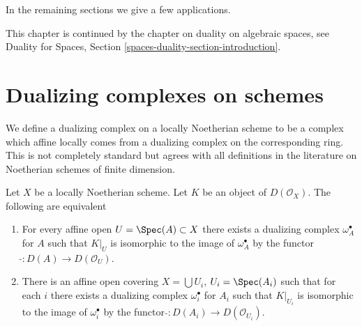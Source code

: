 \medskip\noindent
In the remaining sections we give a few applications.

\medskip\noindent
This chapter is continued by the chapter on duality
on algebraic spaces, see
Duality for Spaces, Section \ref{spaces-duality-section-introduction}.







\section{Dualizing complexes on schemes}
\label{section-dualizing-schemes}

\noindent
We define a dualizing complex on a locally Noetherian scheme
to be a complex which affine locally comes from a dualizing
complex on the corresponding ring. This is not completely
standard but agrees with all definitions in the literature
on Noetherian schemes of finite dimension.

\begin{lemma}
\label{lemma-equivalent-definitions}
Let $X$ be a locally Noetherian scheme. Let $K$ be an object of
$D(\mathcal{O}_X)$. The following are equivalent
\begin{enumerate}
\item For every affine open $U = \Spec(A) \subset X$ there exists
a dualizing complex $\omega_A^\bullet$ for $A$ such that
$K|_U$ is isomorphic to the image of $\omega_A^\bullet$ by
the functor $\widetilde{} : D(A) \to D(\mathcal{O}_U)$.
\item There is an affine open covering $X = \bigcup U_i$, $U_i = \Spec(A_i)$
such that for each $i$ there exists a dualizing complex $\omega_i^\bullet$ for
$A_i$ such that $K|_{U_i}$ is isomorphic to the image of $\omega_i^\bullet$ by
the functor $\widetilde{} : D(A_i) \to D(\mathcal{O}_{U_i})$.
\end{enumerate}
\end{lemma}

